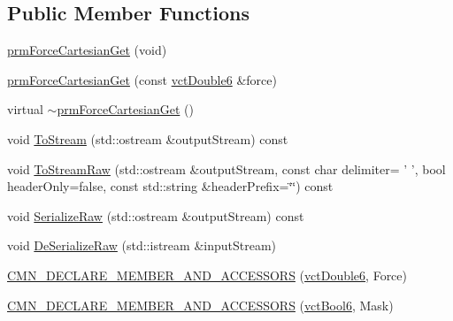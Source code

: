 \subsection*{Public Member Functions}
\begin{DoxyCompactItemize}
\item 
\hyperlink{classprm_force_cartesian_get_aacad506567376093d49ebbd69bea5355}{prm\-Force\-Cartesian\-Get} (void)
\item 
\hyperlink{classprm_force_cartesian_get_a7af1dd7ef1ca587cb037102444dc095a}{prm\-Force\-Cartesian\-Get} (const \hyperlink{vct_fixed_size_vector_types_8h_a26a80e4d58f1201f2bfc347f4ac81bf8}{vct\-Double6} \&force)
\item 
virtual \hyperlink{classprm_force_cartesian_get_a38fd5313a66389faeb4535047eff9019}{$\sim$prm\-Force\-Cartesian\-Get} ()
\item 
void \hyperlink{classprm_force_cartesian_get_a45111d87d2472c075f4221f8c03cc3b2}{To\-Stream} (std\-::ostream \&output\-Stream) const 
\item 
void \hyperlink{classprm_force_cartesian_get_ab632a651988b5cdb45b04e386ca29f45}{To\-Stream\-Raw} (std\-::ostream \&output\-Stream, const char delimiter= ' ', bool header\-Only=false, const std\-::string \&header\-Prefix=\char`\"{}\char`\"{}) const 
\item 
void \hyperlink{classprm_force_cartesian_get_ae1f8dacae06b9c238101f74f789f756a}{Serialize\-Raw} (std\-::ostream \&output\-Stream) const 
\item 
void \hyperlink{classprm_force_cartesian_get_aef7c5f93323985c0c0b3af747c8701ae}{De\-Serialize\-Raw} (std\-::istream \&input\-Stream)
\end{DoxyCompactItemize}
{\bf }\par
\begin{DoxyCompactItemize}
\item 
\hyperlink{classprm_force_cartesian_get_a50ce36300f062d77fa72f04b979e1737}{C\-M\-N\-\_\-\-D\-E\-C\-L\-A\-R\-E\-\_\-\-M\-E\-M\-B\-E\-R\-\_\-\-A\-N\-D\-\_\-\-A\-C\-C\-E\-S\-S\-O\-R\-S} (\hyperlink{vct_fixed_size_vector_types_8h_a26a80e4d58f1201f2bfc347f4ac81bf8}{vct\-Double6}, Force)
\end{DoxyCompactItemize}

{\bf }\par
\begin{DoxyCompactItemize}
\item 
\hyperlink{classprm_force_cartesian_get_adfad42e7974284d2c14461784a9d1151}{C\-M\-N\-\_\-\-D\-E\-C\-L\-A\-R\-E\-\_\-\-M\-E\-M\-B\-E\-R\-\_\-\-A\-N\-D\-\_\-\-A\-C\-C\-E\-S\-S\-O\-R\-S} (\hyperlink{vct_fixed_size_vector_types_8h_a1494a41869ce763813f2bf7f922b8fdd}{vct\-Bool6}, Mask)
\end{DoxyCompactItemize}



